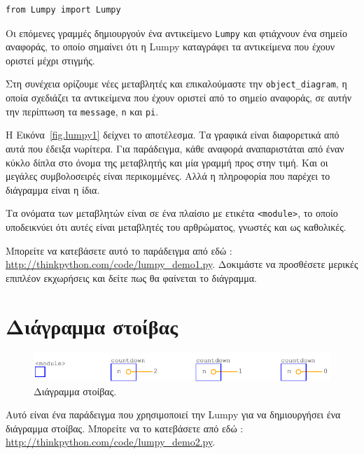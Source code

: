 \documentclass[10pt]{book}
\begin{document}
\begin{verbatim}
from Lumpy import Lumpy
\end{verbatim}

 Οι επόμενες γραμμές δημιουργούν ένα αντικείμενο  {\tt Lumpy}  και φτιάχνουν ένα σημείο αναφοράς, το οποίο σημαίνει ότι η  Lumpy  καταγράφει 
τα αντικείμενα που έχουν οριστεί μέχρι στιγμής.

Στη συνέχεια ορίζουμε νέες μεταβλητές και επικαλούμαστε την \verb"object_diagram", η οποία σχεδιάζει τα αντικείμενα που έχουν οριστεί από 
το σημείο αναφοράς, σε αυτήν την περίπτωση τα  {\tt message}, {\tt n}  και  {\tt pi}.

 Η Εικόνα~\ref{fig.lumpy1}  δείχνει το αποτέλεσμα. Τα γραφικά είναι διαφορετικά από αυτά που έδειξα νωρίτερα.  Για παράδειγμα, κάθε αναφορά αναπαριστάται από έναν κύκλο δίπλα στο όνομα της μεταβλητής και μία γραμμή προς 
στην τιμή.  Και οι μεγάλες συμβολοσειρές είναι περικομμένες.  Αλλά η πληροφορία που παρέχει το διάγραμμα είναι η ίδια.

Τα ονόματα των μεταβλητών είναι σε ένα πλαίσιο με ετικέτα  \verb"<module>",  
το οποίο υποδεικνύει ότι αυτές είναι μεταβλητές του αρθρώματος, γνωστές και ως καθολικές.

Μπορείτε να κατεβάσετε αυτό το παράδειγμα από εδώ : 
\url{http://thinkpython.com/code/lumpy_demo1.py}.   
Δοκιμάστε να προσθέσετε μερικές επιπλέον εκχωρήσεις και δείτε πως θα φαίνεται το διάγραμμα.



\section{Διάγραμμα στοίβας}

\begin{figure}
\centerline
{\includegraphics[scale=0.7]{figs/lumpydemo2.pdf}}
\caption{Διάγραμμα στοίβας.}
\label{fig.lumpy2}
\end{figure}

Αυτό είναι ένα παράδειγμα που χρησιμοποιεί την  Lumpy  για να δημιουργήσει 
ένα διάγραμμα στοίβας.  Μπορείτε να το κατεβάσετε από εδώ :
\url{http://thinkpython.com/code/lumpy_demo2.py}.
 
\end{document}
